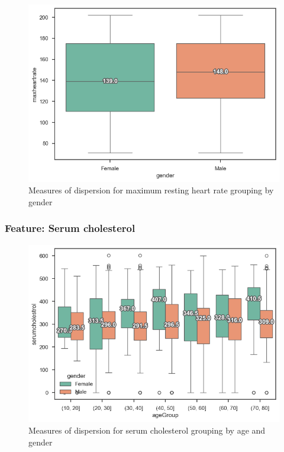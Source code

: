 \begin{figure}
    \caption{Measures of dispersion for maximum resting heart rate grouping by gender}\label{boxplot-heartrate-gender}
    \centering
    \includegraphics[width=\linewidth]{media/boxplot-04-gender-heartrate.png}
\end{figure}

\subsubsection{Feature: Serum cholesterol}

\begin{figure}
    \caption{Measures of dispersion for serum cholesterol grouping by age and gender}\label{boxplot-cholesterol-age}
    \centering
    \includegraphics[width=\linewidth]{media/boxplot-05-agegroup-gender-cholesterol.png}
\end{figure}

